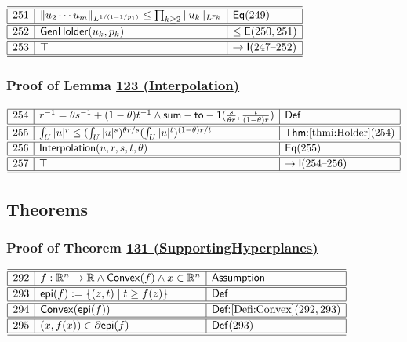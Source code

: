 \documentclass[11pt,reqno]{amsart}
\begin{document}
\medskip

\noindent$%
\begin{array}{|r|l|l|}
\hline\hline
251 & \|u_{2}\cdots u_{m}\|_{L^{1/(1-1/p_{1})}}\le\prod_{k\ge2}\|u_{k}\|_{L^{p_{k}}} & \mathsf{Eq}(249) \\ \hline\hline
252 & \mathsf{GenHolder}(u_{k},p_{k}) & \le\mathsf{E}(250,251) \\ \hline\hline
253 & \top & \to\mathsf{I}(247\text{--}252) \\ \hline\hline
\end{array}%
$

\medskip

\subsubsection*{Proof of Lemma \hyperlink{thm:Interpolation}{123 (\textsf{Interpolation})}}

\noindent$%
\begin{array}{|r|l|l|}
\hline\hline
254 & r^{-1}=\theta s^{-1}+(1-\theta)t^{-1}\wedge\mathsf{sum-to-1}(\tfrac{s}{\theta r},\tfrac{t}{(1-\theta)r}) & \mathsf{Def} \\ \hline\hline
255 & \int_{U}|u|^{r}\le(\int_{U}|u|^{s})^{\theta r/s}(\int_{U}|u|^{t})^{(1-\theta)r/t} & \textsf{Thm:}\ref{thmi:Holder}(254) \\ \hline\hline
256 & \mathsf{Interpolation}(u,r,s,t,\theta) & \mathsf{Eq}(255) \\ \hline\hline
257 & \top & \to\mathsf{I}(254\text{--}256) \\ \hline\hline
\end{array}%
$

\medskip

\subsection*{\textsf{Theorems}}

\subsubsection*{Proof of Theorem \hyperlink{thm:SupportingHyperplanes}{131 (\textsf{SupportingHyperplanes})}}

\noindent$%
\begin{array}{|r|l|l|}
\hline\hline
292 & f:\mathbb{R}^{n}\to\mathbb{R}\wedge\mathsf{Convex}(f)\wedge x\in\mathbb{R}^{n} & \textsf{Assumption} \\ \hline\hline
293 & \mathsf{epi}(f):=\{(z,t)\mid t\ge f(z)\} & \mathsf{Def} \\ \hline\hline
294 & \mathsf{Convex}(\mathsf{epi}(f)) & \textsf{Def:}\ref{Defi:Convex}(292,293) \\ \hline\hline
295 & (x,f(x))\in\partial\mathsf{epi}(f) & \mathsf{Def}(293) \\ \hline\hline
\end{array}%
$
\end{document}
